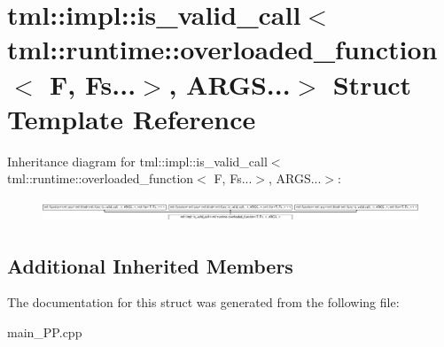 \hypertarget{structtml_1_1impl_1_1is__valid__call_3_01tml_1_1runtime_1_1overloaded__function_3_01F_00_01Fs_8_8_8_4_00_01ARGS_8_8_8_4}{\section{tml\+:\+:impl\+:\+:is\+\_\+valid\+\_\+call$<$ tml\+:\+:runtime\+:\+:overloaded\+\_\+function$<$ F, Fs...$>$, A\+R\+G\+S...$>$ Struct Template Reference}
\label{structtml_1_1impl_1_1is__valid__call_3_01tml_1_1runtime_1_1overloaded__function_3_01F_00_01Fs_8_8_8_4_00_01ARGS_8_8_8_4}
}
Inheritance diagram for tml\+:\+:impl\+:\+:is\+\_\+valid\+\_\+call$<$ tml\+:\+:runtime\+:\+:overloaded\+\_\+function$<$ F, Fs...$>$, A\+R\+G\+S...$>$\+:\begin{figure}[H]
\begin{center}
\leavevmode
\includegraphics[height=0.682511cm]{structtml_1_1impl_1_1is__valid__call_3_01tml_1_1runtime_1_1overloaded__function_3_01F_00_01Fs_8_8_8_4_00_01ARGS_8_8_8_4}
\end{center}
\end{figure}
\subsection*{Additional Inherited Members}


The documentation for this struct was generated from the following file\+:\begin{DoxyCompactItemize}
\item 
main\+\_\+\+P\+P.\+cpp\end{DoxyCompactItemize}
